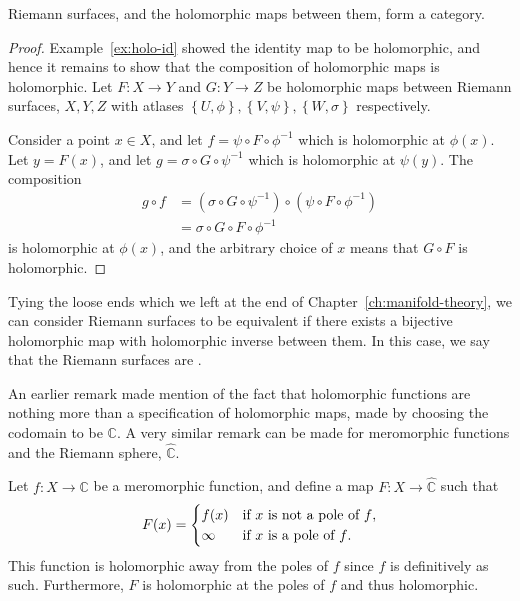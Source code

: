 \begin{proposition}
	Riemann surfaces, and the holomorphic maps between them, form a category.
	\begin{proof}
		Example~\ref{ex:holo-id} showed the identity map to be holomorphic, and hence it
		remains to show that the composition of holomorphic maps is holomorphic. Let $
			F:X \to Y $ and $ G:Y \to Z $ be holomorphic maps between Riemann surfaces, $
			X,Y,Z $ with atlases $ \left\{ U, \phi \right\}, \left\{ V, \psi \right\},
			\left\{ W, \sigma \right\} $ respectively.

		Consider a point $ x \in X $, and let $ f = \psi \circ F \circ \phi ^{-1} $
		which is holomorphic at $ \phi(x) $. Let $ y = F(x) $, and let $ g = \sigma
			\circ G \circ \psi ^{-1} $ which is holomorphic at $ \psi(y) $. The composition
		\begin{align*}
			g \circ f & = \left(\sigma \circ G \circ \psi ^{-1}\right)\circ \left( \psi
			\circ F \circ \phi ^{-1} \right)                                            \\
			          & = \sigma \circ G \circ F \circ \phi ^{-1}
		\end{align*}
		is holomorphic at $ \phi(x) $, and the arbitrary choice of $ x $ means that $ G
			\circ F$ is holomorphic.
	\end{proof}
\end{proposition}

Tying the loose ends which we left at the end of
Chapter~\ref{ch:manifold-theory}, we can consider Riemann surfaces to be
equivalent if there exists a bijective holomorphic map with holomorphic inverse
between them. In this case, we
say that the Riemann surfaces are .

\begin{remark}
	An earlier remark made mention of the fact that holomorphic functions are
	nothing more than a specification of holomorphic maps, made by choosing the
	codomain to be $ \mathbb{C} $. A very similar remark can be made for
	meromorphic functions and the Riemann sphere, $ \hat{\mathbb{C}} $.

	Let $ f:X \to \mathbb{C} $ be a meromorphic function, and define a map $ F:X \to
		\hat{\mathbb{C}} $ such that
	\begin{align*}
		F(x) = \begin{cases}
			       f(x)   & \text{if $ x $ is not a pole of $ f $}, \\
			       \infty & \text{if $ x $ is a pole of $ f $}.
		       \end{cases}
	\end{align*}
	This function is holomorphic away from the poles of $ f $ since $ f $ is
	definitively as such. Furthermore, $ F $ is holomorphic at the poles of $ f $
	and thus holomorphic.
\end{remark}

